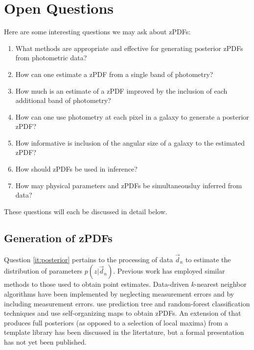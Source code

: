 \documentclass[12pt, onecolumn]{emulateapj}
\begin{document}
\section{Open Questions}

Here are some interesting questions we may ask about zPDFs:

\begin{enumerate}
\item \label{it:posterior} What methods are appropriate and effective for generating posterior zPDFs from photometric data?
\item \label{it:single} How can one estimate a zPDF from a single band of photometry?
\item \label{it:plus} How much is an estimate of a zPDF improved by the inclusion of each additional band of photometry? 
\item \label{it:pixel} How can one use photometry at each pixel in a galaxy to generate a posterior zPDF?
\item \label{it:spatial} How informative is inclusion of the angular size of a galaxy to the estimated zPDF?
\item \label{it:inference} How should zPDFs be used in inference?
\item \label{it:simultaneous} How may physical parameters and zPDFs be simultaneousluy inferred from data?
\end{enumerate}

These questions will each be discussed in detail below.

\subsection{Generation of zPDFs}

Question \ref{it:posterior} pertains to the processing of data $\vec{d}_{n}$ to estimate the distribution of parameters $p(z|\vec{d}_{n})$.  Previous work has employed similar methods to those used to obtain point estimates. Data-driven $k$-nearest neighbor algorithms have been implemented by \citet{she11} neglecting measurement errors and by \citet{bal08} including measurement errors.  \citet{car13} use prediction tree and random-forest classification techniques and \citet{car14} use self-organizing maps  to obtain zPDFs.  An extension of \citet{ben00} that produces full posteriors (as opposed to a selection of local maxima) from a template library has been discussed in the litertature, but a formal presentation has not yet been published.
\end{document}
